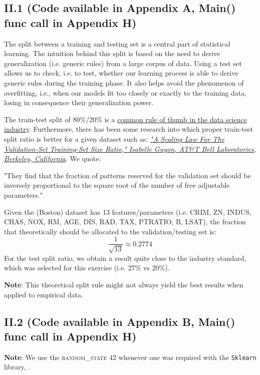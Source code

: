 \documentclass{homework}
\begin{document}
\subsection*{II.1 (Code available in Appendix A, Main() func call in Appendix H)}

The split between a training and testing set is a central part of statistical learning. The intuition behind this split is based on the need to derive
generalization (i.e. generic rules) from a large corpus of data. Using a test set allows us to check, i.e. to test, whether our learning process is 
able to derive generic rules during the training phase. It also helps avoid the phenomenon of overfitting, i.e., when our models fit too closely or exactly 
to the training data, losing in consequence their generalization power.

The train-test split of 80\%/20\% is a \href{https://cs230.stanford.edu/blog/split/}{common rule of thumb in the data science industry}. Furthermore, there 
has been some research into which proper train-test split ratio is better for a given dataset such as: \href{http://citeseerx.ist.psu.edu/viewdoc/download?doi=10.1.1.33.1337&rep=rep1&type=pdf}{\textit{"A Scaling Law 
For The Validation-Set Training-Set Size Ratio," Isabelle Guyon, AT\&T Bell Laboratories, Berkeley, California}}. We quote:
\begin{displayquote}
"They find that the fraction of patterns reserved for the validation set should be inversely proportional to the square root of the number
of free adjustable parameters." \cite{Guyon97ascaling}
\end{displayquote}
Given the (Boston) dataset has 13 features/parameters (i.e. CRIM, ZN, INDUS, CHAS, NOX, RM, AGE, DIS, RAD, TAX, PTRATIO, B, LSAT), the fraction that
theoretically should be allocated to the validation/testing set is:
\textcolor{OliveGreen}{$$\frac{1}{\sqrt{13}}\approx0.2774$$
For the test split ratio, we obtain a result quite close to the industry standard, which was selected for this exercise (i.e. 27\% vs 20\%).}

\textbf{Note}: This theoretical split rule might not always yield the best results when applied to empirical data.

\subsection*{II.2 (Code available in Appendix B, Main() func call in Appendix H)}

\textbf{Note}: We use the \textsc{random\_state} $42$ whenever one was required with the \texttt{Sklearn} library, \cite{sklearn_api}.
\end{document}
